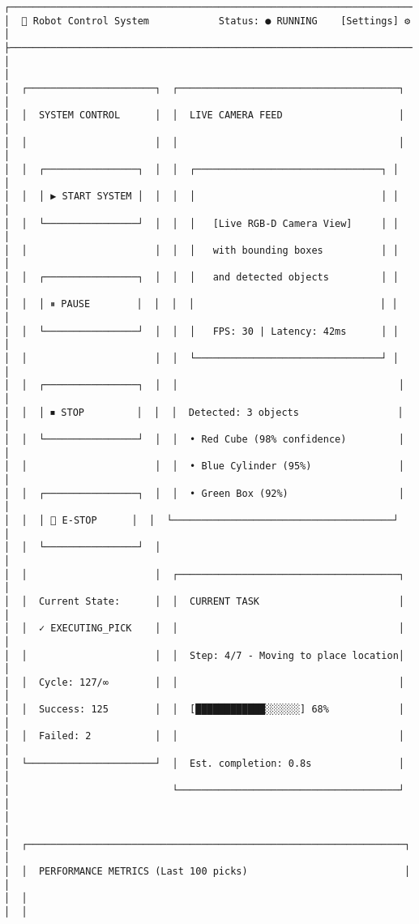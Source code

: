 \documentclass[
]{article}
\begin{document}
\begin{verbatim}
┌────────────────────────────────────────────────────────────────────────┐
│  🤖 Robot Control System            Status: ● RUNNING    [Settings] ⚙  │
├────────────────────────────────────────────────────────────────────────┤
│                                                                        │
│  ┌──────────────────────┐  ┌──────────────────────────────────────┐  │
│  │  SYSTEM CONTROL      │  │  LIVE CAMERA FEED                    │  │
│  │                      │  │                                      │  │
│  │  ┌────────────────┐  │  │  ┌────────────────────────────────┐ │  │
│  │  │ ▶ START SYSTEM │  │  │  │                                │ │  │
│  │  └────────────────┘  │  │  │   [Live RGB-D Camera View]     │ │  │
│  │                      │  │  │   with bounding boxes          │ │  │
│  │  ┌────────────────┐  │  │  │   and detected objects         │ │  │
│  │  │ ⏸ PAUSE        │  │  │  │                                │ │  │
│  │  └────────────────┘  │  │  │   FPS: 30 | Latency: 42ms      │ │  │
│  │                      │  │  └────────────────────────────────┘ │  │
│  │  ┌────────────────┐  │  │                                      │  │
│  │  │ ⏹ STOP         │  │  │  Detected: 3 objects                 │  │
│  │  └────────────────┘  │  │  • Red Cube (98% confidence)         │  │
│  │                      │  │  • Blue Cylinder (95%)               │  │
│  │  ┌────────────────┐  │  │  • Green Box (92%)                   │  │
│  │  │ 🚨 E-STOP      │  │  └──────────────────────────────────────┘  │
│  │  └────────────────┘  │                                            │
│  │                      │  ┌──────────────────────────────────────┐  │
│  │  Current State:      │  │  CURRENT TASK                        │  │
│  │  ✓ EXECUTING_PICK    │  │                                      │  │
│  │                      │  │  Step: 4/7 - Moving to place location│  │
│  │  Cycle: 127/∞        │  │                                      │  │
│  │  Success: 125        │  │  [████████████░░░░░░] 68%            │  │
│  │  Failed: 2           │  │                                      │  │
│  └──────────────────────┘  │  Est. completion: 0.8s               │  │
│                            └──────────────────────────────────────┘  │
│                                                                        │
│  ┌─────────────────────────────────────────────────────────────────┐  │
│  │  PERFORMANCE METRICS (Last 100 picks)                           │  │
│  │                                                                  │  │

\end{verbatim}
\end{document}
